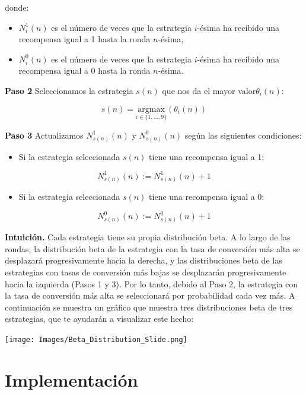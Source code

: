 \documentclass[
]{book}
\providecommand{\tightlist}{%
  \setlength{\itemsep}{0pt}\setlength{\parskip}{0pt}}
\begin{document}
donde:

\begin{itemize}
\tightlist
\item
  \(N_i^1(n)\) es el número de veces que la estrategia \(i\)-ésima ha recibido una recompensa igual a 1 hasta la ronda \(n\)-ésima,
\item
  \(N_i^0(n)\) es el número de veces que la estrategia \(i\)-ésima ha recibido una recompensa igual a 0 hasta la ronda \(n\)-ésima.
\end{itemize}

\textbf{Paso 2} Seleccionamos la estrategia \(s(n)\) que nos da el mayor valor\(\theta_i(n)\):

\[s(n) = \underset{i\in\{1,...,9\}}{\textrm{argmax}}(\theta_i(n))\]

\textbf{Paso 3} Actualizamos \(N_{s(n)}^1(n)\) y \(N_{s(n)}^0(n)\) según las siguientes condiciones:

\begin{itemize}
\tightlist
\item
  Si la estrategia seleccionada \(s(n)\) tiene una recompensa igual a 1:
\end{itemize}

\[N_{s(n)}^1(n) := N_{s(n)}^1(n) + 1\]

\begin{itemize}
\tightlist
\item
  Si la estrategia seleccionada \(s(n)\) tiene una recompensa igual a 0:
\end{itemize}

\[N_{s(n)}^0(n) := N_{s(n)}^0(n) + 1\]

\textbf{Intuición.} Cada estrategia tiene su propia distribución beta. A lo largo de las rondas, la distribución beta de la estrategia con la tasa de conversión más alta se desplazará progresivamente hacia la derecha, y las distribuciones beta de las estrategias con tasas de conversión más bajas se desplazarán progresivamente hacia la izquierda (Pasos 1 y 3). Por lo tanto, debido al Paso 2, la estrategia con la tasa de conversión más alta se seleccionará por probabilidad cada vez más. A continuación se muestra un gráfico que muestra tres distribuciones beta de tres estrategias, que te ayudarán a visualizar este hecho:

\texttt{[image: Images/Beta\_Distribution\_Slide.png]}

\hypertarget{implementaciuxf3n-1}{%
\section{Implementación}\label{implementaciuxf3n-1}}
\end{document}
